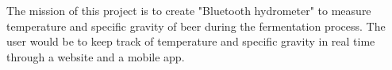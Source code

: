 The mission of this project is to create "Bluetooth hydrometer" to measure temperature and specific gravity of beer during the fermentation process. The user would be to keep track of temperature and specific gravity in real time through a website and a mobile app.